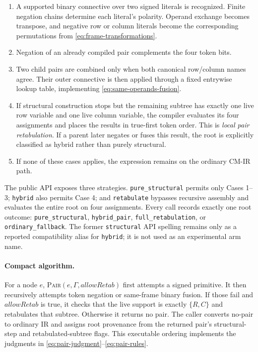 \documentclass[11pt]{article}
\begin{document}
\begin{enumerate}
  \item A supported binary connective over two signed literals is recognized.
  Finite negation chains determine each literal's polarity. Operand exchange
  becomes transpose, and negative row or column literals become the
  corresponding permutations from \eqref{eq:frame-transformations}.
  \item Negation of an already compiled pair complements the four token bits.
  \item Two child pairs are combined only when both canonical row/column names
  agree. Their outer connective is then applied through a fixed entrywise
  lookup table, implementing \eqref{eq:same-operands-fusion}.
  \item If structural construction stops but the remaining subtree has exactly
  one live row variable and one live column variable, the compiler evaluates
  its four assignments and places the results in true-first token order. This
  is \emph{local pair retabulation}. If a parent later negates or fuses this
  result, the root is explicitly classified as hybrid rather than purely
  structural.
  \item If none of these cases applies, the expression remains on the ordinary
  CM-IR path.
\end{enumerate}

The public API exposes three strategies. \texttt{pure\_structural} permits
only Cases 1--3; \texttt{hybrid} also permits Case 4; and
\texttt{retabulate} bypasses recursive assembly and evaluates the entire root
on four assignments. Every call records exactly one root outcome:
\texttt{pure\_structural}, \texttt{hybrid\_pair},
\texttt{full\_retabulation}, or \texttt{ordinary\_fallback}. The former
\texttt{structural} API spelling remains only as a reported compatibility alias
for \texttt{hybrid}; it is not used as an experimental arm name.

\paragraph{Compact algorithm.}
For a node $e$, \textsc{Pair}$(e,\Gamma,\mathit{allowRetab})$ first attempts a
signed primitive. It then recursively attempts token negation or same-frame
binary fusion. If those fail and $\mathit{allowRetab}$ is true, it checks that
the live support is exactly $\{R,C\}$ and retabulates that subtree. Otherwise it
returns no pair. The caller converts no-pair to ordinary IR and assigns root
provenance from the returned pair's structural-step and retabulated-subtree
flags. This executable ordering implements the judgments in
\eqref{eq:pair-judgment}--\eqref{eq:pair-rules}.
\end{document}
